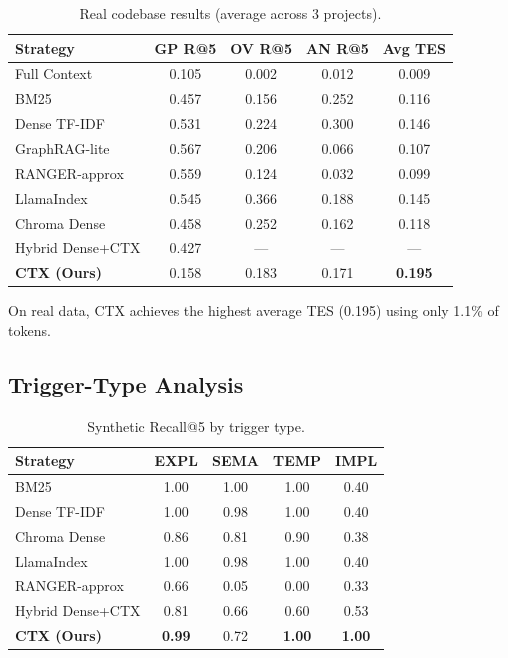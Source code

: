 \documentclass[11pt]{article}
\begin{document}
\begin{table}[t]
\centering
\small
\caption{Real codebase results (average across 3 projects).}
\label{tab:real}
\begin{tabular}{@{}lcccc@{}}
\toprule
\textbf{Strategy} & \textbf{GP R@5} & \textbf{OV R@5} & \textbf{AN R@5} & \textbf{Avg TES} \\
\midrule
Full Context & 0.105 & 0.002 & 0.012 & 0.009 \\
BM25 & 0.457 & 0.156 & 0.252 & 0.116 \\
Dense TF-IDF & 0.531 & 0.224 & 0.300 & 0.146 \\
GraphRAG-lite & 0.567 & 0.206 & 0.066 & 0.107 \\
RANGER-approx & 0.559 & 0.124 & 0.032 & 0.099 \\
LlamaIndex & 0.545 & 0.366 & 0.188 & 0.145 \\
Chroma Dense & 0.458 & 0.252 & 0.162 & 0.118 \\
Hybrid Dense+CTX & 0.427 & --- & --- & --- \\
\textbf{CTX (Ours)} & 0.158 & 0.183 & 0.171 & \textbf{0.195} \\
\bottomrule
\end{tabular}
\end{table}

On real data, CTX achieves the highest average TES (0.195) using only 1.1\% of tokens.

\subsection{Trigger-Type Analysis}

\begin{table}[t]
\centering
\small
\caption{Synthetic Recall@5 by trigger type.}
\label{tab:trigger}
\begin{tabular}{@{}lcccc@{}}
\toprule
\textbf{Strategy} & \textbf{EXPL} & \textbf{SEMA} & \textbf{TEMP} & \textbf{IMPL} \\
\midrule
BM25 & 1.00 & 1.00 & 1.00 & 0.40 \\
Dense TF-IDF & 1.00 & 0.98 & 1.00 & 0.40 \\
Chroma Dense & 0.86 & 0.81 & 0.90 & 0.38 \\
LlamaIndex & 1.00 & 0.98 & 1.00 & 0.40 \\
RANGER-approx & 0.66 & 0.05 & 0.00 & 0.33 \\
Hybrid Dense+CTX & 0.81 & 0.66 & 0.60 & 0.53 \\
\textbf{CTX (Ours)} & \textbf{0.99} & 0.72 & \textbf{1.00} & \textbf{1.00} \\
\bottomrule
\end{tabular}
\end{table}
\end{document}
